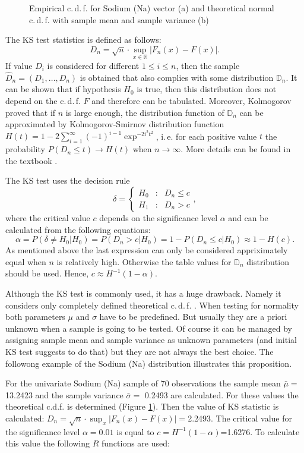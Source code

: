 \documentclass[a4paper, 12pt, titlepage, headsepline, listof = totoc, bibliography = totoc, numbers = noenddot]{scrartcl}
\newcommand{\ie}{i.\,e. }
\newcommand{\cdf}{c.\,d.\,f. }
\begin{document}
\begin{figure}[H]
\begin{subfigure}{.5\textwidth}
  \vspace{-1cm}
  \caption{}
  \label{fig:empiricTeorFunc}
\end{subfigure}
\caption{Empirical \cdf for Sodium (Na) vector (a) and theoretical normal \cdf with
sample mean and sample variance (b)}
\label{fig:commonFigureKStest}
\end{figure}

The KS test statistics is defined as follows:
\[D_n = \sqrt{n}\cdot \sup_{x \in \mathbb{R}}|F_n(x)-F(x)|.\]
If value $D_i$ is considered for different $1\le i\le n$, then the sample
$\hat{D}_n=(D_1,\dots,D_n)$ is obtained that also complies with some
distribution $\mathbb{D}_n$.
It can be shown that if hypothesis $H_0$ is true, then this distribution does not depend on the \cdf $F$
and therefore can be tabulated. Moreover, Kolmogorov proved that if $n$ is large
enough, the distribution function of $\mathbb{D}_n$ can be approximated by
Kolmogorov-Smirnov distribution function
$H(t)=1-2\sum_{i=1}^{\infty}(-1)^{i-1} \exp^{-2i^2t^2}$, \ie for each positive
value $t$ the probability $P(D_n\le t)\to H(t)$ when $n \to \infty$. More
details can be found in the textbook \cite{De02}.

The KS test uses the decision rule
\[ \delta = 
\left\{
\begin{array}{rcl}
H_0&:& D_n\le c\\
H_1&:& D_n> c
\end{array}
\right.,
\]
where the critical value $c$ depends on the significance level $\alpha$ and
can be calculated from the following equations:
\[\alpha = P(\delta \ne H_0|H_0)=P(D_n>c|H_0)=1-P(D_n\le c|H_0)\approx 1-H(c).\]
As mentioned above the last expression can only be considered appriximately equal when $n$ is
relatively high. Otherwise the table values for $\mathbb{D}_n$ distribution
should be used. Hence, $c\approx H^{-1}(1-\alpha)$.

Although the KS test is commonly used, it has a huge drawback. Namely it
considers only completely defined theoretical \cdf. When testing for normality 
both parameters $\mu$ and $\sigma$ have to be predefined. But usually they are
a priori unknown when a sample is going to be tested. Of course it can be
managed by assigning sample mean and sample variance as unknown parameters (and
initial KS test suggests to do that) but they are not always the best choice.
The followong example of the Sodium (Na) distribution illustrates this proposition. 

For the univariate Sodium (Na) sample of 70 observations the sample mean
$\bar{\mu}=$13.2423 and the sample variance $\bar{\sigma}=$
0.2493 are calculated. For these values the
theoretical c.d.f. is determined (Figure \ref{fig:empiricTeorFunc}). Then
the value of KS statistic is calculated: $D_n=\sqrt{n}\cdot
\sup_x|F_n(x)-F(x)|=$2.2493.
The critical value for the significance level $\alpha=0.01$ is equal to
$c=H^{-1}(1-\alpha)$=1.6276. To
calculate this value the following $R$ functions are used:
\end{document}
